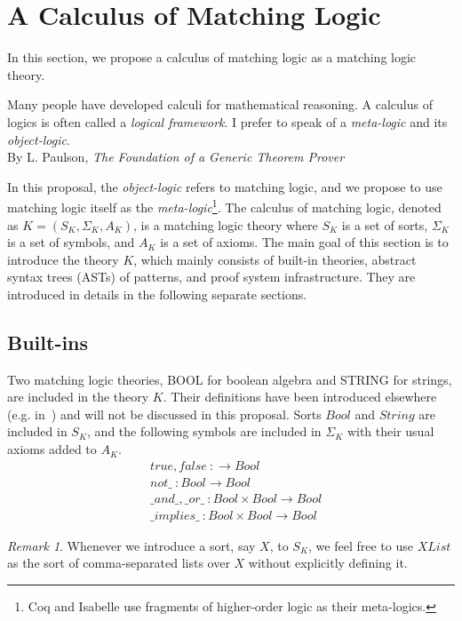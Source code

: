 \documentclass[UTF8]{article}
\newcounter{thmcounter}
\theoremstyle{plain}
\theoremstyle{definition}
\theoremstyle{remark}
\newtheorem{remark}[thmcounter]{Remark}
\begin{document}
\section{A Calculus of Matching Logic}
In this section, we propose a calculus of matching logic as a matching logic 
theory. 
\begin{displayquote}
	Many people have developed calculi for mathematical reasoning. 
	A calculus of logics is often called a \emph{logical framework}.
	I prefer to speak of a \emph{meta-logic} and its \emph{object-logic}. \\
	By L. Paulson, \emph{The Foundation of a Generic Theorem Prover}
\end{displayquote}
In this proposal, the \emph{object-logic} refers to matching logic,
and we propose to use matching logic itself as the 
\emph{meta-logic}\footnote{Coq and Isabelle use 
fragments of higher-order logic as their meta-logics.}. 
The calculus of matching logic, denoted as $K = (S_K, \Sigma_K, A_K)$, is 
a matching logic theory
where $S_K$ is a set of sorts, $\Sigma_K$ is a set of symbols, and $A_K$ is a 
set of axioms. The main goal of this section is to introduce the theory $K$, which mainly consists of built-in theories, abstract syntax trees (ASTs) of patterns, and proof system infrastructure. They are introduced in details in the following separate sections.
\subsection{Built-ins}
Two matching logic theories, {\small BOOL} for boolean algebra and {\small STRING} for strings, are included in the theory $K$. 
Their definitions have been introduced elsewhere (e.g. in~\cite{???}) and will not be discussed in this proposal. 
Sorts $\mathit{Bool}$ and $\mathit{String}$ are included in $S_K$, and the following symbols are included in $\Sigma_K$ with their usual axioms added to $A_K$.
\begin{align*}
&\mathit{true}, \mathit{false} \ \colon \to \mathit{Bool} \\
&\mathit{not\_} \ \colon \mathit{Bool} \to \mathit{Bool} \\
&\mathit{\_and\_}, \mathit{\_or\_} \ \colon \mathit{Bool} \times \mathit{Bool} \to \mathit{Bool}\\
&\mathit{\_implies\_} \ \colon \mathit{Bool} \times \mathit{Bool} \to \mathit{Bool}
\end{align*}

\begin{remark}
	Whenever we introduce a sort, say $\mathit{X}$, to $S_K$, we feel free to use $\mathit{XList}$ as the sort of comma-separated lists over $\mathit{X}$ without explicitly defining it. 
\end{remark}
\end{document}
